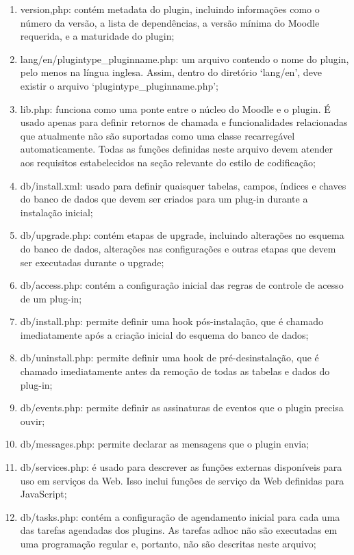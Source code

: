\begin{enumerate} [label=(\alph*)]
    \item version,php: contém metadata do plugin, incluindo informações como o número da versão, a lista de dependências, a versão mínima do Moodle requerida, e a maturidade do plugin;
    \item lang/en/plugintype\_pluginname.php: um arquivo contendo o nome do plugin, pelo menos na língua inglesa. Assim, dentro do diretório ‘lang/en’, deve existir o arquivo ‘plugintype\_pluginname.php’;
    \item lib.php: funciona como uma ponte entre o núcleo do Moodle e o plugin. É usado apenas para definir retornos de chamada e funcionalidades relacionadas que atualmente não são suportadas como uma classe recarregável automaticamente. Todas as funções definidas neste arquivo devem atender aos requisitos estabelecidos na seção relevante do estilo de codificação;
    \item db/install.xml: usado para definir quaisquer tabelas, campos, índices e chaves do banco de dados que devem ser criados para um plug-in durante a instalação inicial;
    \item db/upgrade.php: contém etapas de upgrade, incluindo alterações no esquema do banco de dados, alterações nas configurações e outras etapas que devem ser executadas durante o upgrade;
    \item db/access.php: contém a configuração inicial das regras de controle de acesso de um plug-in;
    \item db/install.php: permite definir uma hook pós-instalação, que é chamado imediatamente após a criação inicial do esquema do banco de dados;
    \item db/uninstall.php: permite definir uma hook de pré-desinstalação, que é chamado imediatamente antes da remoção de todas as tabelas e dados do plug-in;
    \item db/events.php: permite definir as assinaturas de eventos que o plugin precisa ouvir;
    \item db/messages.php: permite declarar as mensagens que o plugin envia;
    \item db/services.php: é usado para descrever as funções externas disponíveis para uso em serviços da Web. Isso inclui funções de serviço da Web definidas para JavaScript;
    \item db/tasks.php: contém a configuração de agendamento inicial para cada uma das tarefas agendadas dos plugins. As tarefas adhoc não são executadas em uma programação regular e, portanto, não são descritas neste arquivo;

\end{enumerate}
